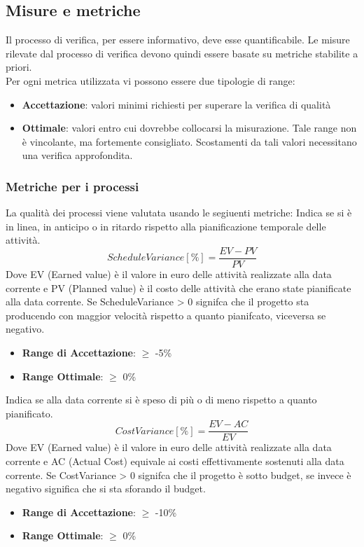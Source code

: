 \documentclass[12pt,a4paper]{article}
\begin{document}
\subsection{Misure e metriche}\label{metriche}
Il processo di verifica, per essere informativo, deve esse quantificabile. Le misure rilevate dal processo di verifica devono quindi essere basate su metriche stabilite a priori.\\
Per ogni metrica utilizzata vi possono essere due tipologie di range:
\begin{itemize}
\item \textbf{Accettazione}: valori minimi richiesti per superare la verifica di qualità
\item \textbf{Ottimale}: valori entro cui dovrebbe collocarsi la misurazione. Tale range non è vincolante, ma fortemente consigliato. Scostamenti da tali valori necessitano una verifica approfondita.
\end{itemize}
\subsubsection{Metriche per i processi}
La qualità dei processi viene valutata usando le segiuenti metriche:
Indica se si è in linea, in anticipo o in ritardo rispetto alla pianificazione temporale delle attività.
\[ScheduleVariance [\%] = \frac{EV - PV}{PV}\]
Dove EV (Earned value) è il valore in euro delle attività realizzate alla data corrente e PV (Planned value) è il costo delle attività che erano state pianificate alla data corrente.
Se ScheduleVariance > 0 signifca che il progetto sta producendo con maggior velocità rispetto a quanto pianifcato, viceversa se negativo.
\begin{itemize}
\item \textbf{Range di Accettazione}: $\geq$ -5\%
\item \textbf{Range Ottimale}: $\geq$ 0\%
\end{itemize}
Indica se alla data corrente si è speso di più o di meno rispetto a quanto pianificato.
\[CostVariance [\%] = \frac{EV - AC}{EV}\]
Dove EV (Earned value) è il valore in euro delle attività realizzate alla data corrente e AC (Actual Cost) equivale ai costi effettivamente sostenuti alla data corrente.
Se CostVariance > 0 signifca che il progetto è sotto budget, se invece è negativo significa che si sta sforando il budget.
\begin{itemize}
\item \textbf{Range di Accettazione}: $\geq$ -10\%
\item \textbf{Range Ottimale}: $\geq$ 0\%
\end{itemize}
\end{document}
